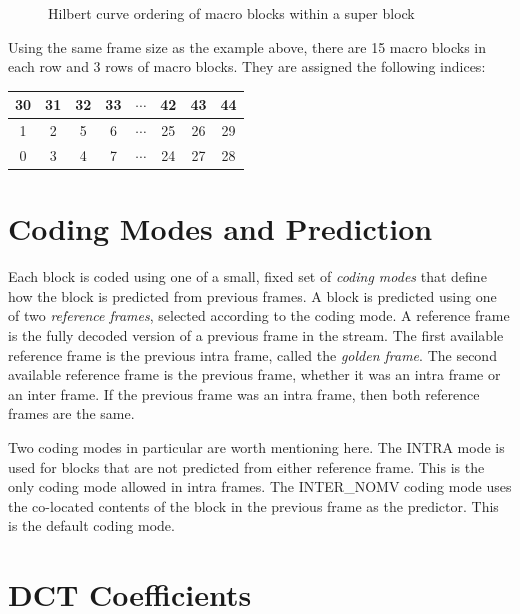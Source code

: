 \documentclass[11pt,letterpaper]{book}
\newcommand{\term}[1]{{\em #1}}
\numberwithin{equation}{chapter}
\numberwithin{figure}{chapter}
\numberwithin{table}{chapter}
\begin{document}
\begin{figure}[htb]
\begin{center}

\end{center}
\caption{Hilbert curve ordering of macro blocks within a super block}
\label{fig:hilbert-mb}
\end{figure}

Using the same frame size as the example above, there are 15 macro blocks in
 each row and 3 rows of macro blocks.
They are assigned the following indices:

\vspace{\baselineskip}
\begin{center}
\begin{tabular}{|cc|cc|c|cc|c|}\hline
30 & 31 & 32 & 33 & $\cdots$ & 42 & 43 & 44 \\\hline
 1 &  2 &  5 &  6 & $\cdots$ & 25 & 26 & 29 \\
 0 &  3 &  4 &  7 & $\cdots$ & 24 & 27 & 28 \\\hline
\end{tabular}
\end{center}
\vspace{\baselineskip}

\section{Coding Modes and Prediction}

Each block is coded using one of a small, fixed set of \term{coding modes} that
 define how the block is predicted from previous frames.
A block is predicted using one of two \term{reference frames}, selected
 according to the coding mode.
A reference frame is the fully decoded version of a previous frame in the
 stream.
The first available reference frame is the previous intra frame, called the
 \term{golden frame}.
The second available reference frame is the previous frame, whether it was an
 intra frame or an inter frame.
If the previous frame was an intra frame, then both reference frames are the
 same.

Two coding modes in particular are worth mentioning here.
The INTRA mode is used for blocks that are not predicted from either reference
 frame.
This is the only coding mode allowed in intra frames.
The INTER\_NOMV coding mode uses the co-located contents of the block in the
 previous frame as the predictor.
This is the default coding mode.

\section{DCT Coefficients}
\end{document}
